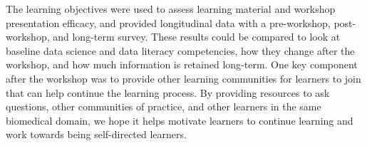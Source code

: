 \documentclass[030-workshop.tex]{subfiles}
\begin{document}
    The learning objectives were used to assess learning material and workshop presentation efficacy,
    and provided longitudinal data with a pre-workshop, post-workshop, and long-term survey.
    These results could be compared to look at baseline data science and data literacy competencies,
    how they change after the workshop,
    and how much information is retained long-term.
    One key component after the workshop was to provide other learning communities for learners to join
    that can help continue the learning process.
    By providing resources to ask questions, other communities of practice,
    and other learners in the same biomedical domain,
    we hope it helps motivate learners to continue learning and work towards being self-directed learners.
\end{document}
